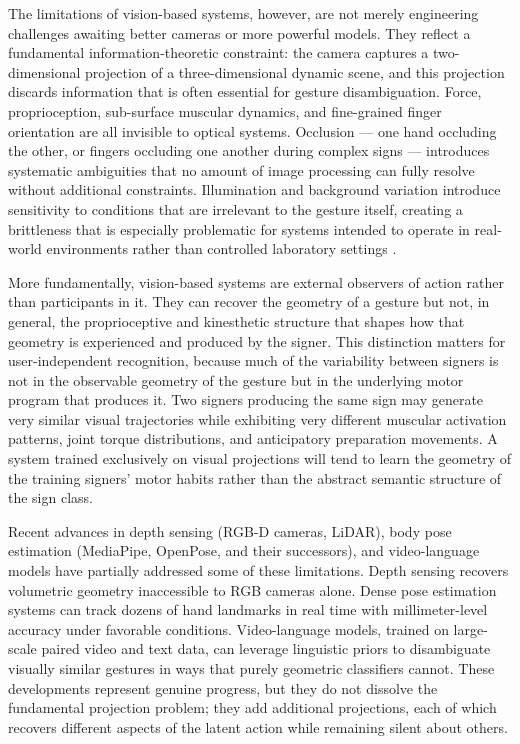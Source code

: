 \documentclass[11pt, a4paper]{article}
\theoremstyle{definition}
\begin{document}
The limitations of vision-based systems, however, are not merely engineering challenges awaiting better cameras or more powerful models. They reflect a fundamental information-theoretic constraint: the camera captures a two-dimensional projection of a three-dimensional dynamic scene, and this projection discards information that is often essential for gesture disambiguation. Force, proprioception, sub-surface muscular dynamics, and fine-grained finger orientation are all invisible to optical systems. Occlusion --- one hand occluding the other, or fingers occluding one another during complex signs --- introduces systematic ambiguities that no amount of image processing can fully resolve without additional constraints. Illumination and background variation introduce sensitivity to conditions that are irrelevant to the gesture itself, creating a brittleness that is especially problematic for systems intended to operate in real-world environments rather than controlled laboratory settings \cite{kudrinko2021}.

More fundamentally, vision-based systems are external observers of action rather than participants in it. They can recover the geometry of a gesture but not, in general, the proprioceptive and kinesthetic structure that shapes how that geometry is experienced and produced by the signer. This distinction matters for user-independent recognition, because much of the variability between signers is not in the observable geometry of the gesture but in the underlying motor program that produces it. Two signers producing the same sign may generate very similar visual trajectories while exhibiting very different muscular activation patterns, joint torque distributions, and anticipatory preparation movements. A system trained exclusively on visual projections will tend to learn the geometry of the training signers' motor habits rather than the abstract semantic structure of the sign class.

Recent advances in depth sensing (RGB-D cameras, LiDAR), body pose estimation (MediaPipe, OpenPose, and their successors), and video-language models have partially addressed some of these limitations. Depth sensing recovers volumetric geometry inaccessible to RGB cameras alone. Dense pose estimation systems can track dozens of hand landmarks in real time with millimeter-level accuracy under favorable conditions. Video-language models, trained on large-scale paired video and text data, can leverage linguistic priors to disambiguate visually similar gestures in ways that purely geometric classifiers cannot. These developments represent genuine progress, but they do not dissolve the fundamental projection problem; they add additional projections, each of which recovers different aspects of the latent action while remaining silent about others.
\end{document}
